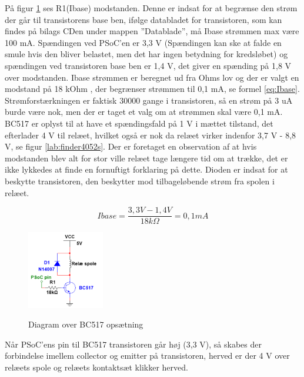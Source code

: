 På figur \ref{lab:BC517} ses R1(Ibase) modstanden. Denne er indsat for at begrænse den strøm der går til transistorens base ben, ifølge databladet for transistoren, som kan findes på bilags CDen under mappen ''Datablade'', må Ibase strømmen max være 100 mA. Spændingen ved PSoC'en er 3,3 V (Spændingen kan ske at falde en smule hvis den bliver belastet, men det har ingen betydning for kredsløbet) og spændingen ved transistoren base ben er 1,4 V, det giver en spænding på 1,8 V over modstanden. Ibase strømmen er beregnet ud fra Ohms lov og der er valgt en modstand på 18 kOhm , der begrænser strømmen til 0,1 mA, se formel \ref{eq:Ibase}.
\newline \newline
Strømforstærkningen er faktisk 30000 gange i transistoren, så en strøm på 3 uA burde være nok, men der er taget et valg om at strømmen skal være 0,1 mA. BC517 er oplyst til at have et spændingsfald på 1 V i mættet tilstand, det efterlader 4 V til relæet, hvilket også er nok da relæet virker indenfor 3,7 V - 8,8 V, se figur \ref{lab:finder4052s}. Der er foretaget en observation af at hvis modstanden blev alt for stor ville relæet tage længere tid om at trække, det er ikke lykkedes at finde en fornuftigt forklaring på dette. Dioden er indsat for at beskytte transistoren, den beskytter mod tilbageløbende strøm fra spolen i relæet.

\begin{equation} 
Ibase = \frac{3,3V - 1,4V}{18k\Omega} = 0,1mA
\label{eq:Ibase}
\end{equation}

\begin{figure}[H] \centering
{\includegraphics[width=0.3\textwidth]{filer/design/Billeder/BC517}}
\caption{Diagram over BC517 opsætning}
\label{lab:BC517}
\raggedright
\end{figure} 

Når PSoC'ens pin til BC517 transistoren går høj (3,3 V), så skabes der forbindelse imellem collector og emitter på transistoren, herved er der 4 V over relæets spole og relæets kontaktsæt klikker herved. 


